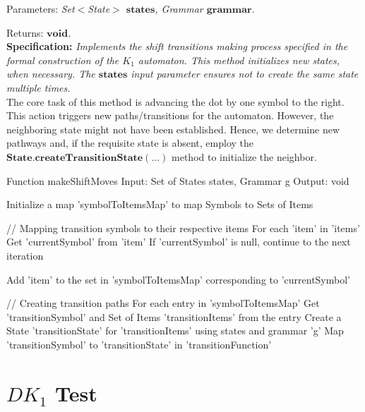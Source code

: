 Parameters: \textit{Set\(<\)State\(>\) \(\boldsymbol{states}\), Grammar \(\boldsymbol{grammar}\).}

Returns: \textit{\(\boldsymbol{void}\).}\\

\textbf{Specification:} \textit{Implements the shift transitions making process specified in the formal construction of the \({K_{1}}\) automaton. This method initializes new states, when necessary. The \(\boldsymbol{states}\) input parameter ensures not to create the same state multiple times.}\\

The core task of this method is advancing the dot by one symbol to the right. This action triggers new paths/transitions for the automaton. However, the neighboring state might not have been established. Hence, we determine new pathways and, if the requisite state is absent, employ the \(\boldsymbol{State.createTransitionState(...)}\) method to initialize the neighbor.\\

\begin{codeblock}
    Function makeShiftMoves
    Input: Set of States states, Grammar g
    Output: void

    Initialize a map 'symbolToItemsMap' to map Symbols to Sets of Items

    // Mapping transition symbols to their respective items
    For each 'item' in 'items'
    Get 'currentSymbol' from 'item'
    If 'currentSymbol' is null, continue to the next iteration

    Add 'item' to the set in 'symbolToItemsMap' corresponding to 'currentSymbol'

    // Creating transition paths
    For each entry in 'symbolToItemsMap'
    Get 'transitionSymbol' and Set of Items 'transitionItems' from the entry
    Create a State 'transitionState' for 'transitionItems' using states and grammar 'g'
    Map 'transitionSymbol' to 'transitionState' in 'transitionFunction'
\end{codeblock}

\newpage


\section{\(DK_{1}\) Test}\label{sec:DK1 Test}


